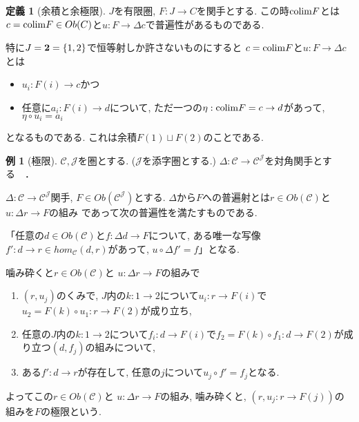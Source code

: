 \documentclass[dvipdfmx,a4paper,11pt]{article}
\newcommand{\colim}{{\rm colim}}
\theoremstyle{definition}
\newtheorem{dfn}[thm]{定義}
\newtheorem{exa}[thm]{例}
\begin{document}
 \begin{tcolorbox}
 [colback = white, colframe = green!35!black, fonttitle = \bfseries,breakable = true]
\begin{dfn}[余積と余極限]
$J$を有限圏, $F : J \to C$を関手とする.
この時$\colim F$とは$c = \colim F \in Ob(C)$と$u : F \to \Delta c$で普遍性があるものである. 

特に$J = {\bf 2} =\{ 1,2\}$で恒等射しか許さないものにすると
$c=\colim F $と$u : F \to \Delta c$とは
\begin{itemize}
\item $u_i : F(i) \to c$かつ
\item 任意に$a_i : F(i) \to d$について, ただ一つの$\eta : \colim F = c \to d$があって, $\eta \circ u_i = a_i$
\end{itemize}
となるものである. これは余積$F(1) \sqcup F(2)$のことである. 
\end{dfn}
 \end{tcolorbox}

\begin{exa}[極限]
$\mathcal{C}, \mathcal{J}$を圏とする. ($\mathcal{J}$を添字圏とする.)
$\Delta : \mathcal{C} \to \mathcal{C}^{\mathcal{J}}$を対角関手とする　．

$\Delta : \mathcal{C} \to \mathcal{C}^{\mathcal{J}}$関手, 
$F \in Ob(\mathcal{C}^{\mathcal{J}})$とする.
$\Delta $から$F$への普遍射とは$r \in Ob(\mathcal{C})$と $u: \Delta r \to F$の組み
であって次の普遍性を満たすものである.

「任意の$d \in Ob(\mathcal{C})$と$f :\Delta d \to F$について, ある唯一な写像$f' : d \to r \in hom_{\mathcal{C}}(d,r)$があって, $u \circ \Delta f'  =f$」となる.


噛み砕くと$r \in Ob(\mathcal{C})$と $u: \Delta r \to F $の組みで
\begin{enumerate}
\item $(r, u_j)$のくみで, $J$内の$k : 1\to 2$について$u_i : r \to F(i) $で$ u_2  = F(k) \circ u_1 : r \to F(2)$が成り立ち, 
\item 任意の$J$内の$k : 1\to 2$について$f_i : d \to F(i) $で$f_2  =  F(k)\circ f_1 : d \to F(2) $が成り立つ$(d, f_j)$の組みについて,
\item ある$f' : d \to r$が存在して, 任意の$j$について$ u_j \circ f' = f_j$となる.
\end{enumerate}
よってこの$r \in Ob(\mathcal{C})$と $u: \Delta r \to F$の組み, 噛み砕くと,
$(r, u_j : r \to F(j))$の組みを$F$の極限という. 
\end{exa}
\end{document}
